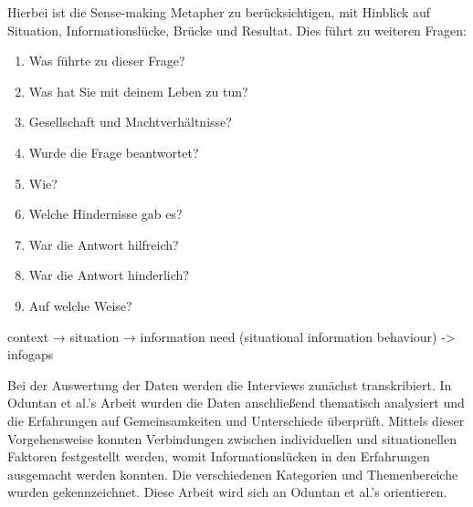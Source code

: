 \documentclass[12pt,oneside]{article}
\begin{document}
Hierbei ist die Sense-making Metapher zu ber\"ucksichtigen, mit Hinblick auf Situation, Informationsl\"ucke, Br\"ucke und Resultat.\cite{dervin2003sense}\newline
Dies f\"uhrt zu weiteren Fragen:\newline
\begin{enumerate}
    \item Was f\"uhrte zu dieser Frage?
    \item Was hat Sie mit deinem Leben zu tun?
    \item Gesellschaft und Machtverh\"altnisse?
    \item Wurde die Frage beantwortet?
    \item Wie?
    \item Welche Hindernisse gab es?
    \item War die Antwort hilfreich?
    \item War die Antwort hinderlich?
    \item Auf welche Weise?
\end{enumerate}

context → situation → information need (situational information behaviour) -> infogaps

\newline
Bei der Auswertung der Daten werden die Interviews zun\"achst transkribiert. In Oduntan et al.'s Arbeit wurden die Daten anschlie\ss{}end thematisch analysiert und die Erfahrungen auf Gemeinsamkeiten und Unterschiede \"uberpr\"uft. Mittels dieser Vorgehensweise konnten Verbindungen zwischen individuellen und situationellen Faktoren festgestellt werden, womit Informationsl\"ucken in den Erfahrungen ausgemacht werden konnten. Die verschiedenen Kategorien und Themenbereiche wurden gekennzeichnet.\cite{oduntan2017investigating} Diese Arbeit wird sich an Oduntan et al.'s orientieren.



\end{document}
